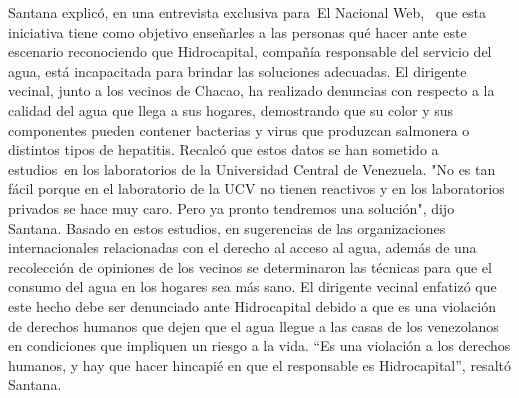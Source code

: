 \documentclass{article}%
\begin{document}
\newline%
%
Santana explicó, en una entrevista exclusiva para~El Nacional Web, ~que esta iniciativa tiene como objetivo enseñarles a las personas qué hacer ante este escenario reconociendo que Hidrocapital, compañía responsable del servicio del agua, está incapacitada para brindar las soluciones adecuadas.%
\newline%
%
El dirigente vecinal, junto a los vecinos de Chacao, ha realizado denuncias con respecto a la calidad del agua que llega a sus hogares, demostrando que su color y sus componentes pueden contener bacterias y virus que produzcan salmonera o distintos tipos de hepatitis. Recalcó que estos datos se han sometido a estudios~en los laboratorios de la Universidad Central de Venezuela.%
\newline%
%
"No es tan fácil porque en el laboratorio de la UCV no tienen reactivos y en los laboratorios privados se hace muy caro. Pero ya pronto tendremos una solución", dijo Santana.%
\newline%
%
Basado en estos estudios, en sugerencias de las organizaciones internacionales relacionadas con el derecho al acceso al agua, además de una recolección de opiniones de los vecinos se determinaron las técnicas para que el consumo del agua en los hogares sea más sano.%
\newline%
%
El dirigente vecinal enfatizó que este hecho debe ser denunciado ante Hidrocapital debido a que es una violación de derechos humanos que dejen que el agua llegue a las casas de los venezolanos en condiciones que impliquen un riesgo a la vida.%
\newline%
%
“Es una violación a los derechos humanos, y hay que hacer hincapié en que el responsable es Hidrocapital”, resaltó Santana.%
\newline%
%
\end{document}

